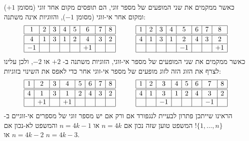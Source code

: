 כאשר ממקמים את שני המופעים של מספר זוגי, הם תופסים מקום אחד זוגי (מסומן 
$+1$)
ומקום אחר אי-זוגי (מסומן 
$-1$),
והזוגיות אינה משתנה:
\[
\begin{array}{|c|c|c|c|c|c|c|c|}
\hline
1&2&3&4&5&6&7&8\\
\hline\hline
4&1&3&1&2&4&3&2\\\hline
-1&&&&&+1&&\\\hline
\end{array}
\hspace{3em}
\begin{array}{|c|c|c|c|c|c|c|c|}
\hline
1&2&3&4&5&6&7&8\\
\hline\hline
4&1&3&1&2&4&3&2\\\hline
&&&&-1&&&+1\\\hline
\end{array}
\]
כאשר ממקמים את שני המופעים של מספר אי-זוגי, הזוגיות משתנה ב-%
$+2$
או 
$-2$,
ולכן עלינו לצרף את הזוג הזה לזוג מופעים של מספר אי-זוגי אחר כדי לאפס את השינוי בזוגיות:
\[
\begin{array}{|c|c|c|c|c|c|c|c|}
\hline
1&2&3&4&5&6&7&8\\
\hline\hline
4&1&3&1&2&4&3&2\\\hline
&+1&&+1&&&&\\\hline
\end{array}
\hspace{3em}
\begin{array}{|c|c|c|c|c|c|c|c|}
\hline
1&2&3&4&5&6&7&8\\
\hline\hline
4&1&3&1&2&4&3&2\\\hline
&&-1&&&&-1&\\\hline
\end{array}
\]
הראינו שייתכן פתרון לבעיית לנגפורד
אם ורק אם יש מספר זוגי של מספרים אי-זוגיים ב-%
$\{1,\ldots,n\}$!
המשפט טוען שזה נכון אם 
$n=4k$
או
$n=4k\!-\!1$
והמשפט לא-נכון אם
$n=4k\!-\!2$
או
$n=4k\!-\!3$.

